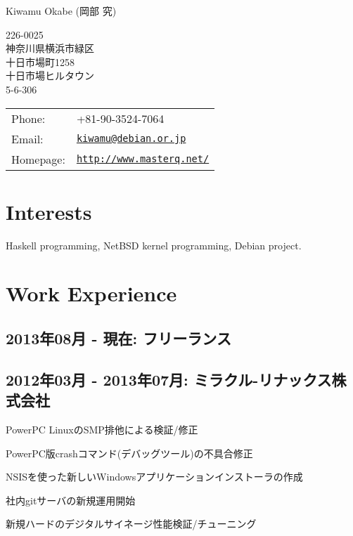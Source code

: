 \documentclass[letterpaper]{article}
\def\name{Kiwamu Okabe (岡部 究)}
\renewenvironment{itemize}{
  \begin{list}{}{
    \setlength{\leftmargin}{1.5em}
  }
}{
  \end{list}
}
\begin{document}
{\huge \name}


\vspace{0.25in}

\begin{minipage}{0.22\linewidth}
  226-0025 \\
  神奈川県横浜市緑区 \\
  十日市場町1258 \\
  十日市場ヒルタウン \\
  5-6-306 \\
\end{minipage}
\begin{minipage}{0.3\linewidth}
  \begin{tabular}{ll}
    Phone: & +81-90-3524-7064 \\
    Email: & \href{mailto:kiwamu@debian.or.jp}{\tt kiwamu@debian.or.jp} \\
    Homepage: & \href{http://www.masterq.net/}{\tt http://www.masterq.net/} \\
  \end{tabular}
\end{minipage}

\section*{Interests}

Haskell programming, NetBSD kernel programming, Debian project.

\section*{Work Experience}
\subsection*{2013年08月 - 現在: フリーランス}

\subsection*{2012年03月 - 2013年07月: ミラクル-リナックス株式会社}

\begin{itemize}
  \item PowerPC LinuxのSMP排他による検証/修正
  \item PowerPC版crashコマンド(デバッグツール)の不具合修正
  \item NSISを使った新しいWindowsアプリケーションインストーラの作成
  \item 社内gitサーバの新規運用開始
  \item 新規ハードのデジタルサイネージ性能検証/チューニング
\end{itemize}
\end{document}

